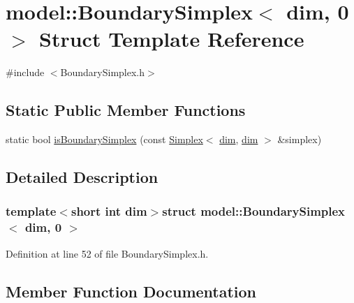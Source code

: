 \hypertarget{structmodel_1_1_boundary_simplex_3_01dim_00_010_01_4}{}\section{model\+:\+:Boundary\+Simplex$<$ dim, 0 $>$ Struct Template Reference}
\label{structmodel_1_1_boundary_simplex_3_01dim_00_010_01_4}


{\ttfamily \#include $<$Boundary\+Simplex.\+h$>$}

\subsection*{Static Public Member Functions}
\begin{DoxyCompactItemize}
\item 
static bool \hyperlink{structmodel_1_1_boundary_simplex_3_01dim_00_010_01_4_a093781b02d4618a9e120753ac3a2a460}{is\+Boundary\+Simplex} (const \hyperlink{classmodel_1_1_simplex}{Simplex}$<$ \hyperlink{plot_nd_a_8m_a382f3ca768b275b8d563604f7fc7df73}{dim}, \hyperlink{plot_nd_a_8m_a382f3ca768b275b8d563604f7fc7df73}{dim} $>$ \&simplex)
\end{DoxyCompactItemize}


\subsection{Detailed Description}
\subsubsection*{template$<$short int dim$>$struct model\+::\+Boundary\+Simplex$<$ dim, 0 $>$}



Definition at line 52 of file Boundary\+Simplex.\+h.



\subsection{Member Function Documentation}
\hypertarget{structmodel_1_1_boundary_simplex_3_01dim_00_010_01_4_a093781b02d4618a9e120753ac3a2a460}{}
